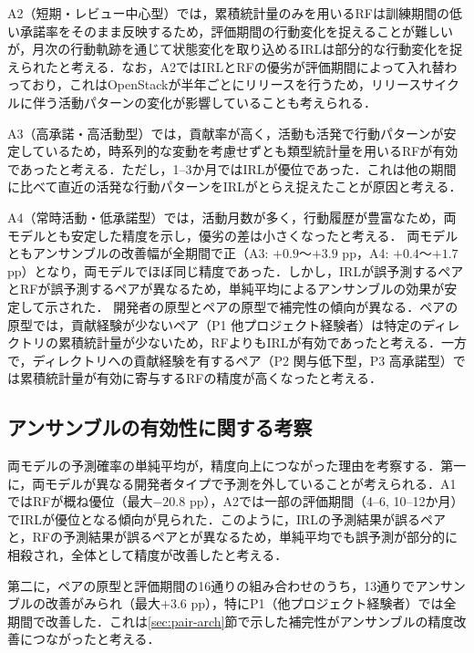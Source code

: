\documentclass[submit,noauthor,ses,dvipdfmx]{ipsj}
\begin{document}
A2（短期・レビュー中心型）では，累積統計量のみを用いるRFは訓練期間の低い承諾率をそのまま反映するため，評価期間の行動変化を捉えることが難しいが，月次の行動軌跡を通じて状態変化を取り込めるIRLは部分的な行動変化を捉えられたと考える．なお，A2ではIRLとRFの優劣が評価期間によって入れ替わっており，これはOpenStackが半年ごとにリリースを行うため，リリースサイクルに伴う活動パターンの変化が影響していることも考えられる．

A3（高承諾・高活動型）では，貢献率が高く，活動も活発で行動パターンが安定しているため，時系列的な変動を考慮せずとも類型統計量を用いるRFが有効であったと考える．ただし，1--3か月ではIRLが優位であった．これは他の期間に比べて直近の活発な行動パターンをIRLがとらえ捉えたことが原因と考える．

A4（常時活動・低承諾型）では，活動月数が多く，行動履歴が豊富なため，両モデルとも安定した精度を示し，優劣の差は小さくなったと考える．
両モデルともアンサンブルの改善幅が全期間で正（A3: $+0.9$〜$+3.9$ pp，A4: $+0.4$〜$+1.7$ pp）となり，両モデルでほぼ同じ精度であった．しかし，IRLが誤予測するペアとRFが誤予測するペアが異なるため，単純平均によるアンサンブルの効果が安定して示された．
開発者の原型とペアの原型で補完性の傾向が異なる．ペアの原型では，貢献経験が少ないペア（P1 他プロジェクト経験者）は特定のディレクトリの累積統計量が少ないため，RFよりもIRLが有効であったと考える．一方で，ディレクトリへの貢献経験を有するペア（P2 関与低下型，P3 高承諾型）では累積統計量が有効に寄与するRFの精度が高くなったと考える．


\vspace{-3mm}
\subsection{アンサンブルの有効性に関する考察}
両モデルの予測確率の単純平均が，精度向上につながった理由を考察する．第一に，両モデルが異なる開発者タイプで予測を外していることが考えられる．A1ではRFが概ね優位（最大$-20.8$ pp），A2では一部の評価期間（4--6, 10--12か月）でIRLが優位となる傾向が見られた．このように，IRLの予測結果が誤るペアと，RFの予測結果が誤るペアとが異なるため，単純平均でも誤予測が部分的に相殺され，全体として精度が改善したと考える．

第二に，ペアの原型と評価期間の16通りの組み合わせのうち，13通りでアンサンブルの改善がみられ（最大$+3.6$ pp），特にP1（他プロジェクト経験者）では全期間で改善した．これは\ref{sec:pair-arch}節で示した補完性がアンサンブルの精度改善につながったと考える．
\end{document}
